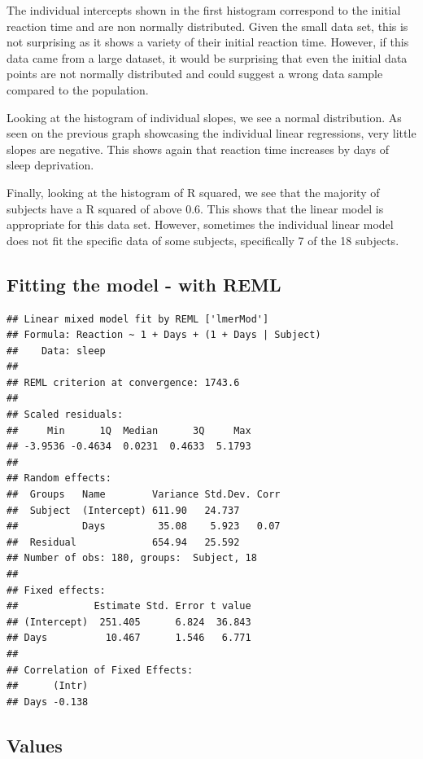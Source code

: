 \documentclass[
]{article}
\begin{document}
The individual intercepts shown in the first histogram correspond to the
initial reaction time and are non normally distributed. Given the small
data set, this is not surprising as it shows a variety of their initial
reaction time. However, if this data came from a large dataset, it would
be surprising that even the initial data points are not normally
distributed and could suggest a wrong data sample compared to the
population.

Looking at the histogram of individual slopes, we see a normal
distribution. As seen on the previous graph showcasing the individual
linear regressions, very little slopes are negative. This shows again
that reaction time increases by days of sleep deprivation.

Finally, looking at the histogram of R squared, we see that the majority
of subjects have a R squared of above 0.6. This shows that the linear
model is appropriate for this data set. However, sometimes the
individual linear model does not fit the specific data of some subjects,
specifically 7 of the 18 subjects.

\hypertarget{fitting-the-model---with-reml}{%
\subsection{Fitting the model - with
REML}\label{fitting-the-model---with-reml}}

\begin{verbatim}
## Linear mixed model fit by REML ['lmerMod']
## Formula: Reaction ~ 1 + Days + (1 + Days | Subject)
##    Data: sleep
## 
## REML criterion at convergence: 1743.6
## 
## Scaled residuals: 
##     Min      1Q  Median      3Q     Max 
## -3.9536 -0.4634  0.0231  0.4633  5.1793 
## 
## Random effects:
##  Groups   Name        Variance Std.Dev. Corr
##  Subject  (Intercept) 611.90   24.737       
##           Days         35.08    5.923   0.07
##  Residual             654.94   25.592       
## Number of obs: 180, groups:  Subject, 18
## 
## Fixed effects:
##             Estimate Std. Error t value
## (Intercept)  251.405      6.824  36.843
## Days          10.467      1.546   6.771
## 
## Correlation of Fixed Effects:
##      (Intr)
## Days -0.138
\end{verbatim}

\hypertarget{values}{%
\subsection{Values}\label{values}}
\end{document}
